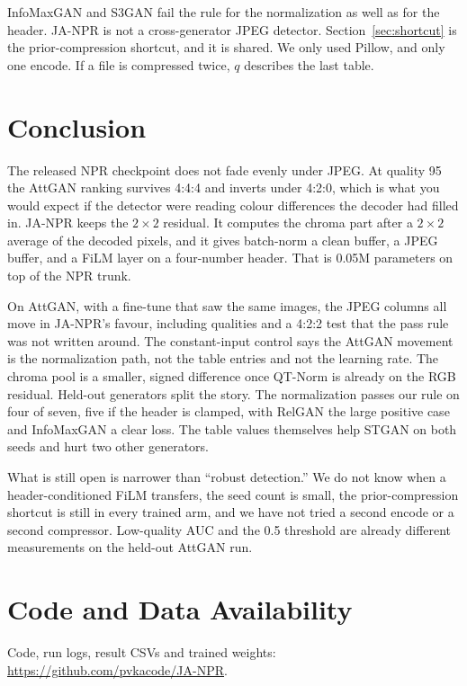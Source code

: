 \documentclass[conference]{IEEEtran}
\begin{document}
InfoMaxGAN and S3GAN fail the rule for the normalization as well as for the header. JA-NPR is not a cross-generator JPEG detector. Section~\ref{sec:shortcut} is the prior-compression shortcut, and it is shared. We only used Pillow, and only one encode. If a file is compressed twice, $q$ describes the last table.

\section{Conclusion}
The released NPR checkpoint does not fade evenly under JPEG. At quality 95 the AttGAN ranking survives 4:4:4 and inverts under 4:2:0, which is what you would expect if the detector were reading colour differences the decoder had filled in. JA-NPR keeps the $2{\times}2$ residual. It computes the chroma part after a $2{\times}2$ average of the decoded pixels, and it gives batch-norm a clean buffer, a JPEG buffer, and a FiLM layer on a four-number header. That is 0.05M parameters on top of the NPR trunk.

On AttGAN, with a fine-tune that saw the same images, the JPEG columns all move in JA-NPR's favour, including qualities and a 4:2:2 test that the pass rule was not written around. The constant-input control says the AttGAN movement is the normalization path, not the table entries and not the learning rate. The chroma pool is a smaller, signed difference once QT-Norm is already on the RGB residual. Held-out generators split the story. The normalization passes our rule on four of seven, five if the header is clamped, with RelGAN the large positive case and InfoMaxGAN a clear loss. The table values themselves help STGAN on both seeds and hurt two other generators.

What is still open is narrower than ``robust detection.'' We do not know when a header-conditioned FiLM transfers, the seed count is small, the prior-compression shortcut is still in every trained arm, and we have not tried a second encode or a second compressor. Low-quality AUC and the 0.5 threshold are already different measurements on the held-out AttGAN run.

\section*{Code and Data Availability}
Code, run logs, result CSVs and trained weights: \url{https://github.com/pvkacode/JA-NPR}.
\end{document}
